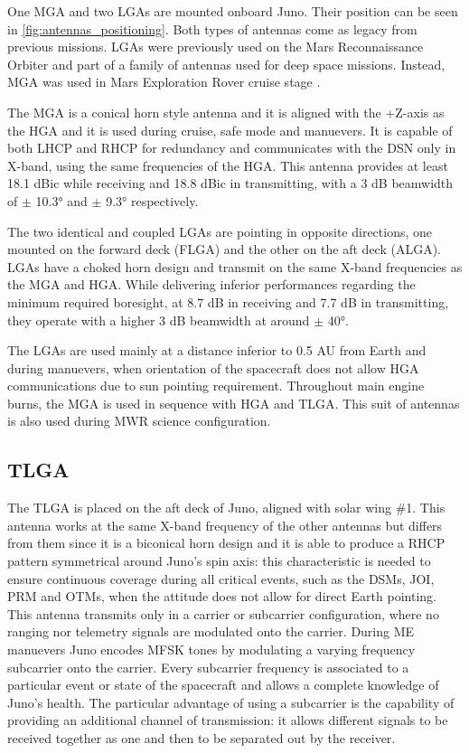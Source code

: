 One MGA and two LGAs are mounted onboard Juno. Their position can be seen in \autoref{fig:antennas_positioning}. Both types of antennas come as legacy from previous missions. LGAs were previously used on the Mars Reconnaissance Orbiter and part of a family of antennas used for deep space missions. Instead, MGA was used in Mars Exploration Rover cruise stage \cite{telecommunication_antennas}.

The MGA is a conical horn style antenna and it is aligned with the +Z-axis as the HGA and it is used during cruise, safe mode and manuevers. It is capable of both LHCP and RHCP for redundancy and communicates with the DSN only in X-band, using the same frequencies of the HGA. This antenna provides at least 18.1 dBic while receiving and 18.8 dBic in transmitting, with a 3 dB beamwidth of $\pm$ 10.3° and $\pm$ 9.3° respectively. 

The two identical and coupled LGAs are pointing in opposite directions, one mounted on the forward deck (FLGA) and the other on the aft deck (ALGA). LGAs have a choked horn design and transmit on the same X-band frequencies as the MGA and HGA. While delivering inferior performances regarding the minimum required boresight, at 8.7 dB in receiving and 7.7 dB in transmitting, they operate with a higher 3 dB beamwidth at around $\pm$ 40°\cite{juno_telecommunication}. 

The LGAs are used mainly at a distance inferior to 0.5 AU from Earth and during manuevers, when orientation of the spacecraft does not allow HGA communications due to sun pointing requirement. Throughout main engine burns, the MGA is used in sequence with HGA and TLGA. This suit of antennas is also used during MWR science configuration.

\subsection{TLGA}
\label{subsec:tlga}

The TLGA is placed on the aft deck of Juno, aligned with solar wing $\#$1. This antenna works at the same X-band frequency of the other antennas but differs from them since it is a biconical horn design and it is able to produce a RHCP pattern symmetrical around Juno's spin axis: this characteristic is needed to ensure continuous coverage during all critical events, such as the DSMs, JOI, PRM and OTMs, when the attitude does not allow for direct Earth pointing. 
This antenna transmits only in a carrier or subcarrier configuration, where no ranging nor telemetry signals are modulated onto the carrier. During ME manuevers Juno encodes MFSK tones by modulating a varying frequency subcarrier onto the carrier. Every subcarrier frequency is associated to a particular event or state of the spacecraft and allows a complete knowledge of Juno's health. The particular advantage of using a subcarrier is the capability of providing an additional channel of transmission: it allows different signals to be received together as one and then to be separated out by the receiver.


